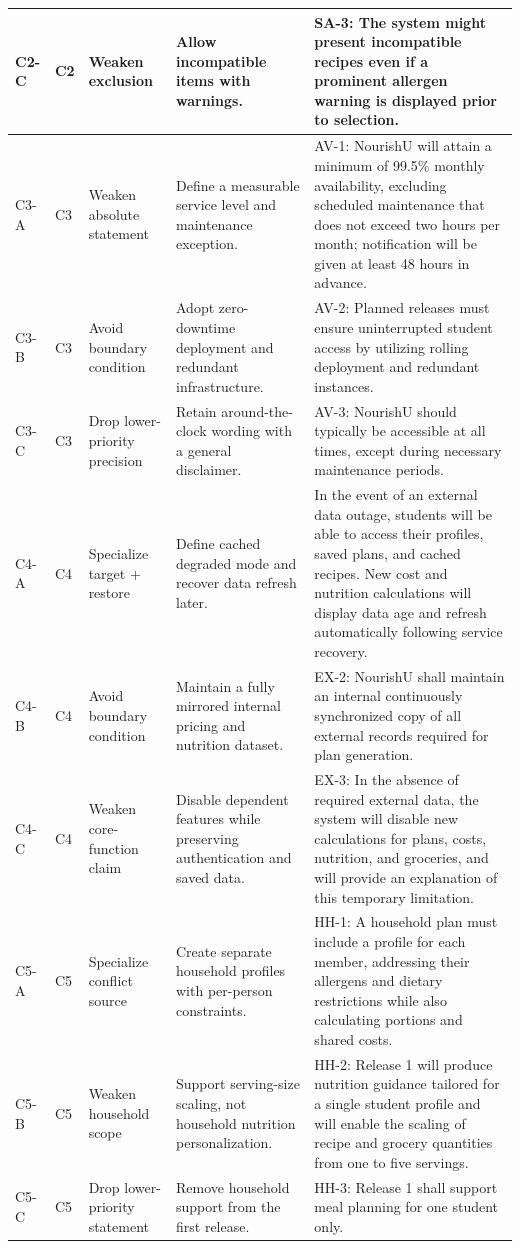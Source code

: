 \documentclass[11pt,a4paper]{article}
\begin{document}
\begin{landscape}
\begin{center}
\begin{longtable}{|p{1.2cm}|p{1.1cm}|p{3.8cm}|p{6.0cm}|p{12.0cm}|}
C2-C & C2 & Weaken exclusion & Allow incompatible items with warnings. & SA-3: The system might present incompatible recipes even if a prominent allergen warning is displayed prior to selection. \\ \hline
C3-A & C3 & Weaken absolute statement & Define a measurable service level and maintenance exception. & AV-1: NourishU will attain a minimum of 99.5\% monthly availability, excluding scheduled maintenance that does not exceed two hours per month; notification will be given at least 48 hours in advance. \\ \hline
C3-B & C3 & Avoid boundary condition & Adopt zero-downtime deployment and redundant infrastructure. & AV-2: Planned releases must ensure uninterrupted student access by utilizing rolling deployment and redundant instances. \\ \hline
C3-C & C3 & Drop lower-priority precision & Retain around-the-clock wording with a general disclaimer. & AV-3: NourishU should typically be accessible at all times, except during necessary maintenance periods. \\ \hline
C4-A & C4 & Specialize target + restore & Define cached degraded mode and recover data refresh later. & In the event of an external data outage, students will be able to access their profiles, saved plans, and cached recipes. New cost and nutrition calculations will display data age and refresh automatically following service recovery. \\ \hline
C4-B & C4 & Avoid boundary condition & Maintain a fully mirrored internal pricing and nutrition dataset. & EX-2: NourishU shall maintain an internal continuously synchronized copy of all external records required for plan generation. \\ \hline
C4-C & C4 & Weaken core-function claim & Disable dependent features while preserving authentication and saved data. & EX-3: In the absence of required external data, the system will disable new calculations for plans, costs, nutrition, and groceries, and will provide an explanation of this temporary limitation. \\ \hline
C5-A & C5 & Specialize conflict source & Create separate household profiles with per-person constraints. & HH-1: A household plan must include a profile for each member, addressing their allergens and dietary restrictions while also calculating portions and shared costs. \\ \hline
C5-B & C5 & Weaken household scope & Support serving-size scaling, not household nutrition personalization. & HH-2: Release 1 will produce nutrition guidance tailored for a single student profile and will enable the scaling of recipe and grocery quantities from one to five servings. \\ \hline
C5-C & C5 & Drop lower-priority statement & Remove household support from the first release. & HH-3: Release 1 shall support meal planning for one student only. \\ \hline
\end{longtable}
\end{center}
\end{landscape}
\end{document}
